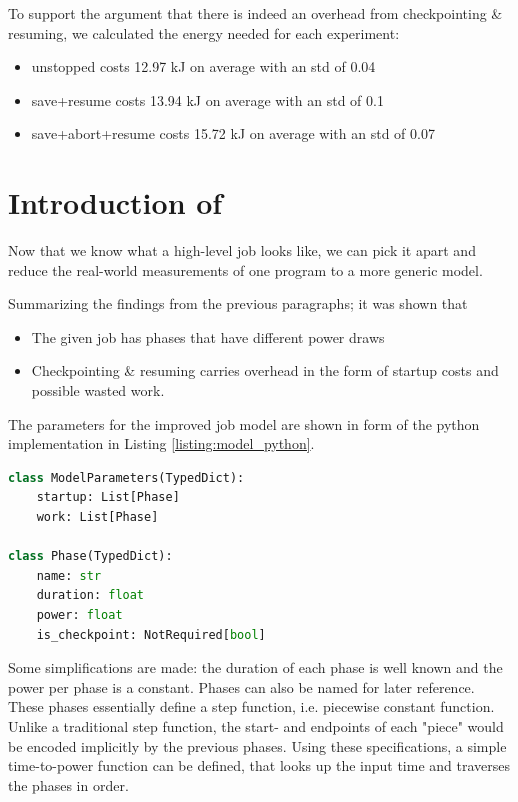 To support the argument that there is indeed an overhead from checkpointing \& resuming, we calculated the energy needed for each experiment:

\begin{itemize}
    \item  unstopped costs 12.97 kJ on average with an std of 0.04
    \item  save+resume costs 13.94 kJ on average with an std of 0.1
    \item  save+abort+resume costs 15.72 kJ on average with an std of 0.07
\end{itemize}

\section{Introduction of \modelname}

Now that we know what a high-level job looks like, we can pick it apart and reduce the real-world measurements of one program to a more generic model. 

Summarizing the findings from the previous paragraphs; it was shown that 

\begin{itemize}
    \item The given job has phases that have different power draws
    \item Checkpointing \& resuming carries overhead in the form of startup costs and possible wasted work.
\end{itemize}

The parameters for the improved job model are shown in form of the python implementation in Listing \ref{listing:model_python}.

\begin{minipage}{\linewidth}
\begin{lstlisting}[language=python, frame=single, numbers=none, caption={Python Model definition}, basicstyle=\ttfamily, label={listing:model_python}]
class ModelParameters(TypedDict):
    startup: List[Phase]
    work: List[Phase]
    
class Phase(TypedDict):
    name: str
    duration: float
    power: float
    is_checkpoint: NotRequired[bool]   
\end{lstlisting}
\end{minipage}

Some simplifications are made: the duration of each phase is well known and the power per phase is a constant. 
Phases can also be named for later reference.
These phases essentially define a step function, i.e. piecewise constant function.
Unlike a traditional step function, the start- and endpoints of each "piece" would be encoded implicitly by the previous phases.
Using these specifications, a simple time-to-power function can be defined, that looks up the input time and traverses the phases in order.


